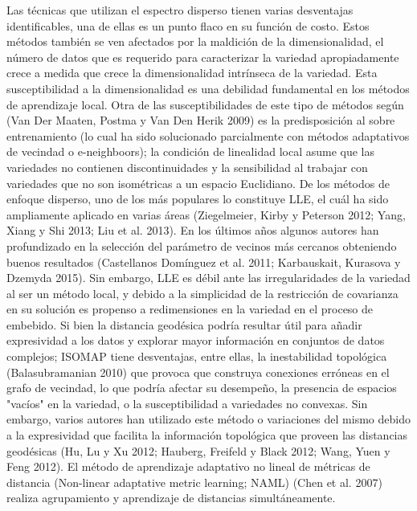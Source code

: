 \documentclass[12pt,a4paper]{report}
\begin{document}
Las técnicas que utilizan el espectro disperso tienen varias desventajas identificables, una de ellas es un punto flaco en su función de costo. Estos métodos también se ven afectados por la maldición de la dimensionalidad, el número de datos que es requerido para caracterizar la variedad apropiadamente crece a medida que crece la dimensionalidad intrínseca de la variedad. Esta susceptibilidad a la dimensionalidad es una debilidad fundamental en los métodos de aprendizaje local. Otra de las susceptibilidades de este tipo de métodos según (Van Der Maaten, Postma y Van Den Herik 2009) es la predisposición al sobre entrenamiento (lo cual ha sido solucionado parcialmente con métodos adaptativos de vecindad o e-neighboors); la condición de linealidad local asume que las variedades no contienen discontinuidades y la sensibilidad al trabajar con variedades que no son isométricas a un espacio Euclidiano.
De los métodos de enfoque disperso, uno de los más populares lo constituye LLE, el cuál ha sido ampliamente aplicado en varias áreas (Ziegelmeier, Kirby y Peterson 2012; Yang, Xiang y Shi 2013; Liu et al. 2013). En los últimos años algunos autores han profundizado en la selección del parámetro de vecinos más cercanos obteniendo buenos resultados (Castellanos Domínguez et al. 2011; Karbauskait, Kurasova y Dzemyda 2015). Sin embargo, LLE es débil ante las irregularidades de la variedad al ser un método local, y debido a la simplicidad de la restricción de covarianza en su solución es propenso a redimensiones en la variedad en el proceso de embebido.
Si bien la distancia geodésica podría resultar útil para añadir expresividad a los datos y explorar mayor información en conjuntos de datos complejos; ISOMAP tiene desventajas, entre ellas, la inestabilidad topológica (Balasubramanian 2010) que provoca que construya conexiones erróneas en el grafo de vecindad, lo que podría afectar su desempeño, la presencia de espacios "vacíos" en la variedad, o la susceptibilidad a variedades no convexas. Sin embargo, varios autores han utilizado este método o variaciones del mismo debido a la expresividad que facilita la información topológica que proveen las distancias geodésicas (Hu, Lu y Xu 2012; Hauberg, Freifeld y Black 2012; Wang, Yuen y Feng 2012).
El método de aprendizaje adaptativo no lineal de métricas de distancia (Non-linear adaptative metric learning; NAML) (Chen et al. 2007) realiza agrupamiento y aprendizaje de distancias simultáneamente.
\end{document}
